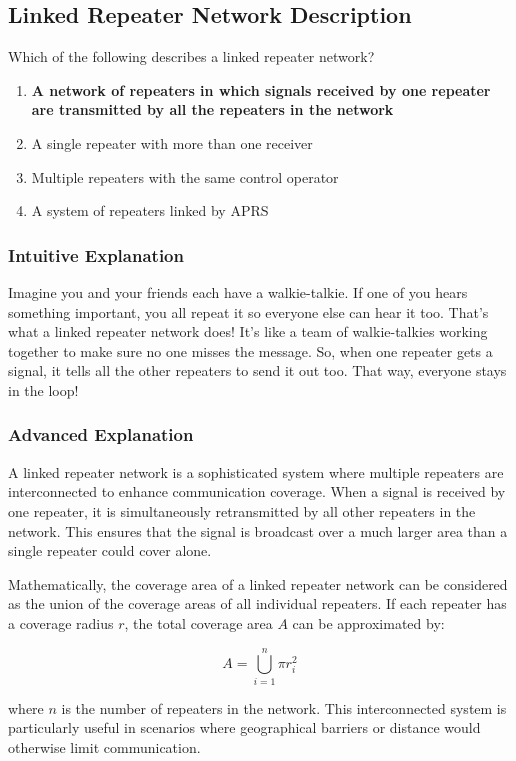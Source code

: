 \subsection{Linked Repeater Network Description}
\label{T2B03}

\begin{tcolorbox}[colback=gray!10!white,colframe=black!75!black,title=T2B03]
Which of the following describes a linked repeater network?
\begin{enumerate}[label=\Alph*)]
    \item \textbf{A network of repeaters in which signals received by one repeater are transmitted by all the repeaters in the network}
    \item A single repeater with more than one receiver
    \item Multiple repeaters with the same control operator
    \item A system of repeaters linked by APRS
\end{enumerate}
\end{tcolorbox}

\subsubsection{Intuitive Explanation}
Imagine you and your friends each have a walkie-talkie. If one of you hears something important, you all repeat it so everyone else can hear it too. That's what a linked repeater network does! It’s like a team of walkie-talkies working together to make sure no one misses the message. So, when one repeater gets a signal, it tells all the other repeaters to send it out too. That way, everyone stays in the loop!

\subsubsection{Advanced Explanation}
A linked repeater network is a sophisticated system where multiple repeaters are interconnected to enhance communication coverage. When a signal is received by one repeater, it is simultaneously retransmitted by all other repeaters in the network. This ensures that the signal is broadcast over a much larger area than a single repeater could cover alone.

Mathematically, the coverage area of a linked repeater network can be considered as the union of the coverage areas of all individual repeaters. If each repeater has a coverage radius \( r \), the total coverage area \( A \) can be approximated by:

\[ A = \bigcup_{i=1}^{n} \pi r_i^2 \]

where \( n \) is the number of repeaters in the network. This interconnected system is particularly useful in scenarios where geographical barriers or distance would otherwise limit communication.

